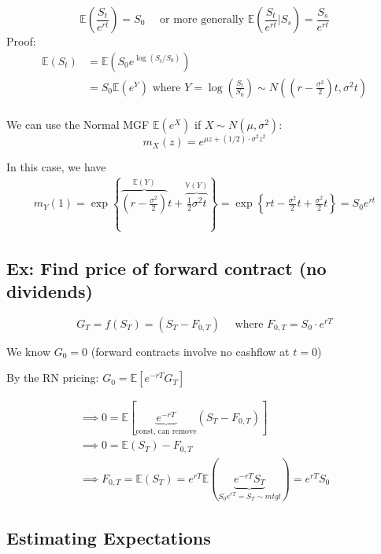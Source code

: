 \documentclass[
  oneside]{book}
\begin{document}
\[
\mathbb{E}\left( \frac{S_{t}}{e^{rt}}\right) = S_{0} \quad \text{ or more generally } \mathbb{E}\left( \frac{S_{t}}{e^{rt}} |S_{s} \right) = \frac{S_{s}}{e^{rt}}
\]
Proof:
\[
\begin{aligned}
\mathbb{E}(S_{t}) &= \mathbb{E}(S_{0}e^{\log(S_{t}/S_{0})})\\
&= S_{0}\mathbb{E}(e^{Y}) \text{ where } Y=\log\left( \frac{S_{t}}{S_{0}} \right) \sim N\left( \left( r-\frac{\sigma^{2}}{2} \right)t, \sigma^{2}t \right)\\
\end{aligned}
\]

We can use the Normal MGF \(\mathbb{E}(e^{X})\) if \(X\sim N(\mu, \sigma^{2})\):
\[
m_{X}(z) = e^{\mu z+(1/2) \cdot \sigma^{2}z^{2}}
\]

In this case, we have
\[
\begin{aligned}
m_{Y}(1) = \exp \left\{ \overbrace{ \left( r-\frac{\sigma^{2}}{2} \right) }^{ \mathbb{E}(Y) } t + \overbrace{ \frac{1}{2} \sigma^{2}t }^{ \mathbb{V}(Y) }\right\}  = \exp \left\{  rt-\frac{\sigma^{2}}{2} t + \frac{\sigma^{2}}{2} t\right\} = S_{0}e^{rt}
\end{aligned}
\]

\hypertarget{ex-find-price-of-forward-contract-no-dividends}{%
\subsection{Ex: Find price of forward contract (no dividends)}\label{ex-find-price-of-forward-contract-no-dividends}}

\[
G_{T} = f(S_{T}) = (S_{T} - F_{0,T}) \quad \text{ where } F_{0,T} = S_{0}\cdot e^{rT}
\]

We know \(G_{0}=0\) (forward contracts involve no cashflow at \(t=0\))

By the RN pricing: \(G_{0} = \mathbb{E}[e^{-rT}G_{T}]\)

\[
\begin{gathered}
\implies 0 = \mathbb{E}\left[\underbrace{  e^{-rT} }_{ \text{const, can remove} } (S_{T}-F_{0,T}) \right]\\
\implies 0=\mathbb{E}(S_{T}) - F_{0,T}\\
\implies F_{0,T} = \mathbb{E}(S_{T}) = e^{rT}\mathbb{E}(\underbrace{ e^{-rT}S_{T} }_{ S_{0}e^{rT} = S_{T}  \sim mtgl}) = e^{rT}S_{0}
\end{gathered}
\]

\hypertarget{estimating-expectations}{%
\subsection{Estimating Expectations}\label{estimating-expectations}}
\end{document}
